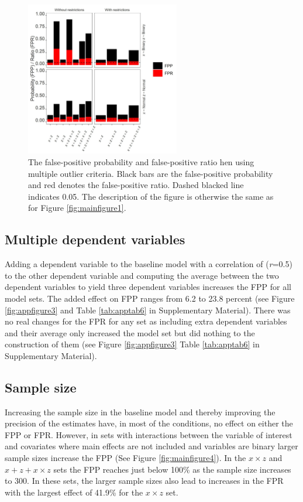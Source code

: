 \begin{figure}[hbt!]
\includegraphics[width=0.6\textwidth]{R/Analysis/Result/Figures/Figure1B.jpeg}
\centering
\caption{The false-positive probability and false-positive ratio hen using multiple outlier criteria. Black bars are the false-positive probability and red denotes the false-positive ratio. Dashed blacked line indicates 0.05. The description of the figure is otherwise the same as for Figure \ref{fig:mainfigure1}.}
\label{fig:mainfigure3}
\end{figure}

\subsection{Multiple dependent variables}
Adding a dependent variable to the baseline model with a correlation of (\textit{r}=0.5) to the other dependent variable and computing the average between the two dependent variables to yield three dependent variables increases the FPP for all model sets. The added effect on FPP ranges from 6.2 to 23.8 percent (see Figure \ref{fig:appfigure3} and Table \ref{tab:apptab6} in Supplementary Material). There was no real changes for the FPR for any set as including extra dependent variables and their average only increased the model set but did nothing to the construction of them (see Figure \ref{fig:appfigure3} Table \ref{tab:apptab6} in Supplementary Material).   

\subsection{Sample size}
Increasing the sample size in the baseline model and thereby improving the precision of the estimates have, in most of the conditions, no effect on either the FPP or FPR. However, in sets with interactions between the variable of interest and covariates where main effects are not included and variables are binary larger sample sizes increase the FPP (See Figure \ref{fig:mainfigure4}). In the $x \times z$ and $x + z+ x \times z$ sets the FPP reaches just below 100\% as the sample size increases to 300. In these sets, the larger sample sizes also lead to increases in the FPR with the largest effect of 41.9\% for the $x \times z$ set.  



